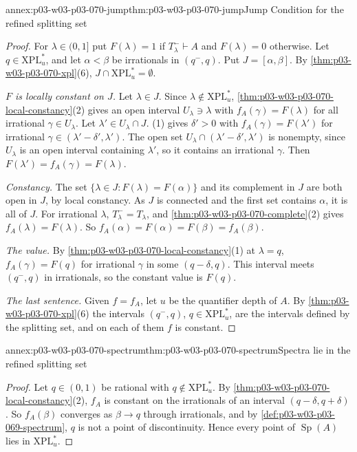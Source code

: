 \begin{annexitem}{annex:p03-w03-p03-070-jump}{thm:p03-w03-p03-070-jump}{Jump Condition for the refined splitting set}
\begin{proof}
For \(\lambda\in(0,1]\) put \(F(\lambda)=1\) if \(T^-_\lambda\vdash A\) and
\(F(\lambda)=0\) otherwise.  Let \(q\in\mathrm{XPL}^\ast_u\), and let
\(\alpha<\beta\) be irrationals in \((q^-,q)\).  Put \(J=[\alpha,\beta]\).  By
\cref{thm:p03-w03-p03-070-xpl}(6), \(J\cap\mathrm{XPL}^\ast_u=\emptyset\).

\emph{\(F\) is locally constant on \(J\).}  Let \(\lambda\in J\).  Since
\(\lambda\notin\mathrm{XPL}^\ast_u\),
\cref{thm:p03-w03-p03-070-local-constancy}(2) gives an open interval
\(U_\lambda\ni\lambda\) with \(f_A(\gamma)=F(\lambda)\) for all irrational
\(\gamma\in U_\lambda\).  Let \(\lambda'\in U_\lambda\cap J\).
(1) gives \(\delta'>0\) with
\(f_A(\gamma)=F(\lambda')\) for irrational \(\gamma\in(\lambda'-\delta',\lambda')\).
The open set \(U_\lambda\cap(\lambda'-\delta',\lambda')\) is nonempty, since
\(U_\lambda\) is an open interval containing \(\lambda'\), so it contains an
irrational \(\gamma\).  Then \(F(\lambda')=f_A(\gamma)=F(\lambda)\).

\emph{Constancy.}  The set \(\{\lambda\in J:F(\lambda)=F(\alpha)\}\) and its
complement in \(J\) are both open in \(J\), by local constancy.  As \(J\) is
connected and the first set contains \(\alpha\), it is all of \(J\).  For
irrational \(\lambda\), \(T^-_\lambda=T_\lambda\), and
\cref{thm:p03-w03-p03-070-complete}(2) gives \(f_A(\lambda)=F(\lambda)\).  So
\(f_A(\alpha)=F(\alpha)=F(\beta)=f_A(\beta)\).

\emph{The value.}  By \cref{thm:p03-w03-p03-070-local-constancy}(1) at
\(\lambda=q\), \(f_A(\gamma)=F(q)\) for irrational \(\gamma\) in some
\((q-\delta,q)\).  This interval meets \((q^-,q)\) in irrationals, so the
constant value is \(F(q)\).

\emph{The last sentence.}  Given \(f=f_A\), let \(u\) be the quantifier depth
of \(A\).  By \cref{thm:p03-w03-p03-070-xpl}(6) the intervals
\((q^-,q)\), \(q\in\mathrm{XPL}^\ast_u\), are the intervals defined by the
splitting set, and on each of them \(f\) is constant.
\end{proof}
\end{annexitem}

\begin{annexitem}{annex:p03-w03-p03-070-spectrum}{thm:p03-w03-p03-070-spectrum}{Spectra lie in the refined splitting set}
\begin{proof}
Let \(q\in(0,1)\) be rational with \(q\notin\mathrm{XPL}^\ast_u\).  By
\cref{thm:p03-w03-p03-070-local-constancy}(2), \(f_A\) is constant on the
irrationals of an interval \((q-\delta,q+\delta)\).  So \(f_A(\beta)\)
converges as \(\beta\to q\) through irrationals, and by
\cref{def:p03-w03-p03-069-spectrum}, \(q\) is not a point of discontinuity.
Hence every point of \(\operatorname{Sp}(A)\) lies in \(\mathrm{XPL}^\ast_u\).
\end{proof}
\end{annexitem}


